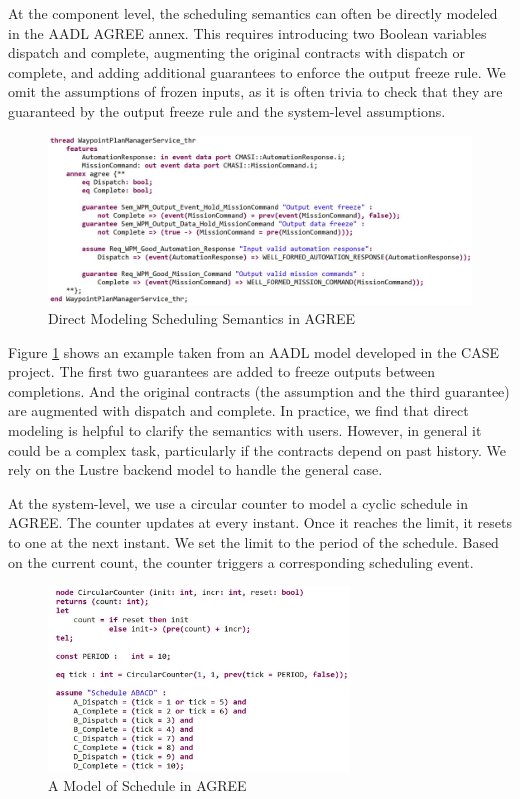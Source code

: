 At the component level, the scheduling semantics can often be directly modeled in the AADL AGREE annex. This requires introducing two Boolean variables dispatch and complete, augmenting the original contracts with dispatch or complete, and adding additional guarantees to enforce the output freeze rule. We omit the assumptions of frozen inputs, as it is often trivia to check that they are guaranteed by the output freeze rule and the system-level assumptions.

\begin{figure}[ht!]
\centering
\includegraphics[width=130mm]{wpmAGREE3.jpg}
\caption{Direct Modeling Scheduling Semantics in AGREE\label{wpmAGREE}}
\end{figure}

Figure \ref{wpmAGREE} shows an example taken from an AADL model developed in the CASE project. The first two guarantees are added to freeze outputs between completions. And the original contracts (the assumption and the third guarantee) are augmented with dispatch and complete.
In practice, we find that direct modeling is helpful to clarify the semantics with users. However, in general it could be a complex task, particularly if the contracts depend on past history. We rely on the Lustre backend model to handle the general case.

At the system-level, we use a circular counter to model a cyclic schedule in AGREE. 
The counter updates at every instant. Once it reaches the limit, it resets to one at the next instant.
We set the limit to the period of the schedule. 
Based on the current count, the counter triggers a corresponding scheduling event.

\begin{figure}[ht!]
\centering
\includegraphics[width=80mm]{schedule.jpg}
\caption{A Model of Schedule in AGREE\label{schedule}}
\end{figure}

